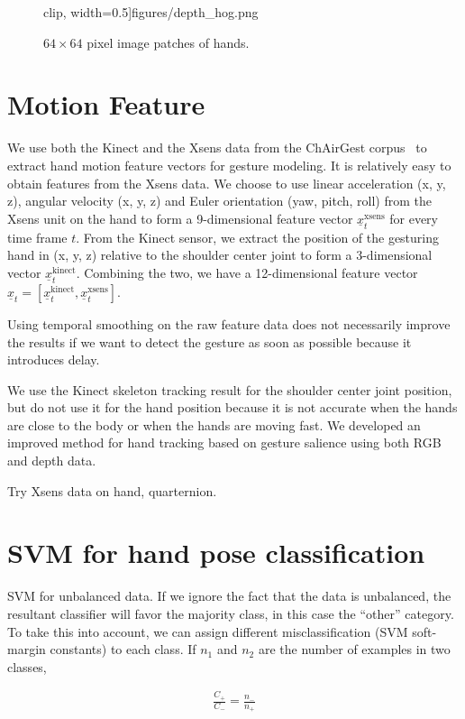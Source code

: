 \begin{figure}[h]
{  clip, width=0.5\textwidth]{figures/depth_hog.png}
  }
  \caption{$64\times64$ pixel image patches of hands.} \label{fig:hand}
\end{figure}

\section{Motion Feature}
We use both the Kinect and the Xsens data from the ChAirGest corpus~\cite{Ruffieux2013} to
extract hand motion feature vectors for gesture modeling.
It is relatively easy to obtain features from the Xsens data. We choose to use linear
acceleration (x, y, z), angular velocity (x, y, z) and Euler orientation (yaw, pitch, roll)
from the Xsens unit on the hand to form a 9-dimensional feature vector $\underline{x}_t^{\text{xsens}}$
for every time frame $t$.
From the Kinect sensor, we extract the position of the gesturing hand in (x, y, z) relative to
the shoulder center joint to
form a 3-dimensional vector $\underline{x}_t^{\text{kinect}}$. Combining the two, we
have a 12-dimensional feature vector $\underline{x}_t = [\underline{x}^\text{kinect}_t, \underline{x}^\text{xsens}_t]$.

Using temporal smoothing on the raw feature data does not necessarily improve
the results if we want to detect the gesture as soon as possible because it
introduces delay.

We use the Kinect skeleton tracking result for the shoulder center joint position,
but do not use it for the hand position because
it is not accurate when the hands are close to the body or when the hands are moving fast.
We developed an improved method for hand tracking based on gesture salience using both
RGB and depth data.

Try Xsens data on hand, quarternion.

\section{SVM for hand pose classification}
SVM for unbalanced data. \cite{ben2010}
If we ignore the  fact that the data is unbalanced, the resultant classifier
will favor the majority class, in this case the ``other'' category. To take this
into account, we can assign different misclassification (SVM soft-margin
constants) to each class. If $n_1$ and $n_2$ are the number of examples in two
classes, 

\begin{align}
\frac{C_+}{C_-} = \frac{n_-}{n_+}
\end{align}

